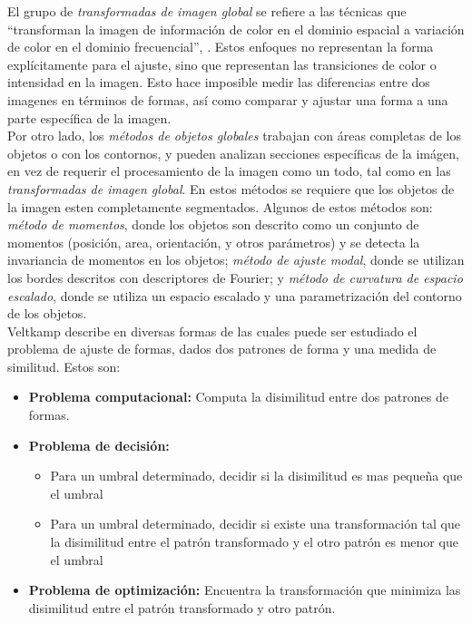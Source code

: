 El grupo de \emph{transformadas de imagen global} se refiere a las 
t\'ecnicas que ``transforman la imagen de informaci\'on de color en
el dominio espacial a variaci\'on de color en el dominio frecuencial'', 
\cite{matchingbook}. Estos enfoques no representan la forma expl\'icitamente 
para el ajuste,
sino que representan las transiciones de color o intensidad en
la imagen. Esto hace imposible medir las diferencias entre dos
imagenes en t\'erminos de formas, as\'i como comparar y ajustar
una forma a una parte espec\'ifica de la imagen.\\
Por otro lado, los \emph{m\'etodos de objetos globales} trabajan 
con \'areas completas de los objetos o con los contornos, y pueden
analizan secciones espec\'ificas de la im\'agen, en vez de requerir
el procesamiento de la imagen como un todo, tal como en las 
\emph{transformadas de imagen global}. En estos m\'etodos se requiere
que los objetos de la imagen esten completamente segmentados. Algunos
de estos m\'etodos son: \emph{m\'etodo de momentos}, donde los
objetos son descrito como un conjunto de momentos (posici\'on, area,
orientaci\'on, y otros par\'ametros) y se detecta la invariancia de 
momentos en los objetos; \emph{m\'etodo de ajuste modal}, donde 
se utilizan los bordes descritos con descriptores de Fourier; y
\emph{m\'etodo de curvatura de espacio escalado}, donde se utiliza 
un espacio escalado y una parametrizaci\'on del contorno de los objetos.\\

Veltkamp describe en \cite{matching2} diversas formas de las cuales
puede ser estudiado el problema de ajuste de formas, dados
dos patrones de forma y una medida de similitud. Estos son:


\begin{itemize}
\item \textbf{Problema computacional:} Computa la disimilitud entre
dos patrones de formas.
\item \textbf{Problema de decisi\'on: }
  \begin{itemize}
  \item  Para un umbral determinado, decidir si la disimilitud es 
    mas peque\~na que el umbral
  \item Para un umbral determinado, decidir si existe una transformaci\'on
    tal que la disimilitud entre el patr\'on transformado y el otro
    patr\'on es menor que el umbral
  \end{itemize}
 
\item \textbf{Problema de optimizaci\'on: } Encuentra la transformaci\'on
que minimiza las disimilitud entre el patr\'on transformado y otro patr\'on.
\end{itemize}

